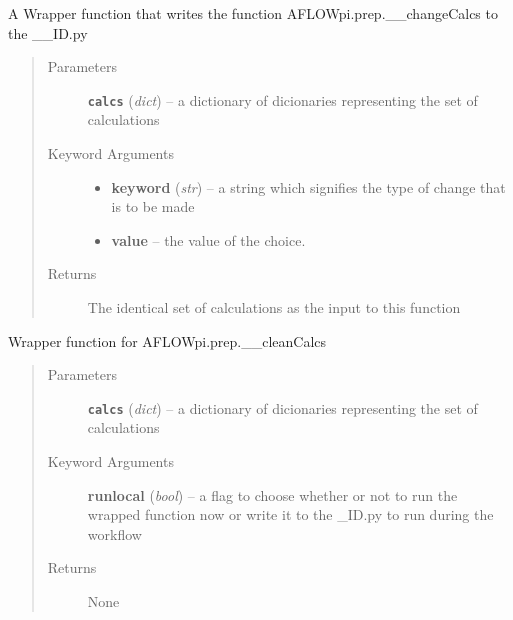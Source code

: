 \documentclass[letterpaper,10pt,english]{sphinxmanual}
\begin{document}

\begin{fulllineitems}
\label{prep:prep.changeCalcs}
A Wrapper function that writes the function AFLOWpi.prep.\_\_changeCalcs to the \_\_ID.py
\begin{quote}\begin{description}
\item[{Parameters}] \leavevmode
\textbf{\texttt{calcs}} (\emph{dict}) -- a dictionary of dicionaries representing the set of calculations

\item[{Keyword Arguments}] \leavevmode\begin{itemize}
\item {} 
\textbf{keyword} (\emph{str}) --
a string which signifies the type of change that is to be made

\item {} 
\textbf{value} --
the value of the choice.

\end{itemize}

\item[{Returns}] \leavevmode
The identical set of calculations as the input to this function

\end{description}\end{quote}

\end{fulllineitems}


\begin{fulllineitems}
\label{prep:prep.cleanCalcs}
Wrapper function for AFLOWpi.prep.\_\_cleanCalcs
\begin{quote}\begin{description}
\item[{Parameters}] \leavevmode
\textbf{\texttt{calcs}} (\emph{dict}) -- a dictionary of dicionaries representing the set of calculations

\item[{Keyword Arguments}] \leavevmode
\textbf{runlocal} (\emph{bool}) --
a flag to choose whether or not to run the wrapped function now
or write it to the \_ID.py to run during the workflow

\item[{Returns}] \leavevmode
None

\end{description}\end{quote}

\end{fulllineitems}
\end{document}
